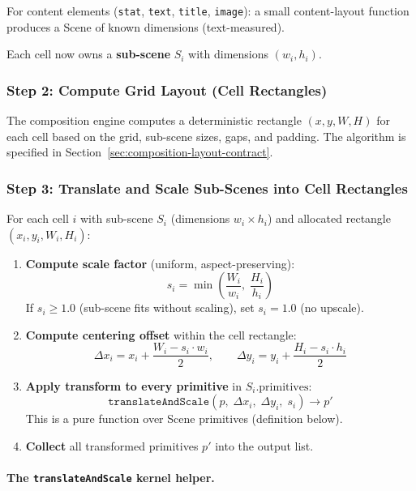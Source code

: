 For content elements (\texttt{stat}, \texttt{text}, \texttt{title}, \texttt{image}): a small content-layout function produces a Scene of known dimensions (text-measured).

Each cell now owns a \textbf{sub-scene} $S_i$ with dimensions $(w_i, h_i)$.

\subsubsection{Step 2: Compute Grid Layout (Cell Rectangles)}

The composition engine computes a deterministic rectangle $(x, y, W, H)$ for each cell based on the grid, sub-scene sizes, gaps, and padding.  The algorithm is specified in Section~\ref{sec:composition-layout-contract}.

\subsubsection{Step 3: Translate and Scale Sub-Scenes into Cell Rectangles}

For each cell $i$ with sub-scene $S_i$ (dimensions $w_i \times h_i$) and allocated rectangle $(x_i, y_i, W_i, H_i)$:

\begin{enumerate}
  \item \textbf{Compute scale factor} (uniform, aspect-preserving):
    \[
      s_i = \min\!\left(\frac{W_i}{w_i},\; \frac{H_i}{h_i}\right)
    \]
    If $s_i \geq 1.0$ (sub-scene fits without scaling), set $s_i = 1.0$ (no upscale).

  \item \textbf{Compute centering offset} within the cell rectangle:
    \[
      \Delta x_i = x_i + \frac{W_i - s_i \cdot w_i}{2}, \qquad
      \Delta y_i = y_i + \frac{H_i - s_i \cdot h_i}{2}
    \]

  \item \textbf{Apply transform to every primitive} in $S_i.\text{primitives}$:
    \[
      \texttt{translateAndScale}(p,\; \Delta x_i,\; \Delta y_i,\; s_i) \to p'
    \]
    This is a pure function over Scene primitives (definition below).

  \item \textbf{Collect} all transformed primitives $p'$ into the output list.
\end{enumerate}

\paragraph{The \texttt{translateAndScale} kernel helper.}
\label{para:translate-scale-helper}


